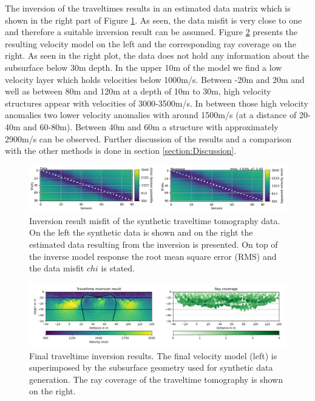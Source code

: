 The inversion of the traveltimes results in an estimated data matrix which is shown in the right part of Figure \ref{figure:TT_inversion_misfits}. As seen, the data misfit is very close to one and therefore a suitable inversion result can be assumed. Figure \ref{figure:TT_inversion_comp} presents the resulting velocity model on the left and the corresponding ray coverage on the right. As seen in the right plot, the data does not hold any information about the subsurface below 30m depth. In the upper 10m of the model we find a low velocity layer which holds velocities below 1000m/s. Between -20m and 20m and well as between 80m and 120m at a depth of 10m to 30m, high velocity structures appear with velocities of 3000-3500m/s. In between those high velocity anomalies two lower velocity anomalies with around 1500m/s (at a distance of 20-40m and 60-80m). Between 40m and 60m a structure with approximately 2900m/s can be observed. Further discussion of the results and a comparison with the other methods is done in section \ref{section:Discussion}.

\begin{figure}[]
  \centering
    \includegraphics[width=\textwidth]{Figures/TT_RF_labels.png}
    \caption[Traveltime inversion result misfit]{Inversion result misfit of the synthetic traveltime tomography data. On the left the synthetic data is shown and on the right the estimated data resulting from the inversion is presented. On top of the inverse model response the root mean square error (RMS) and the data misfit $chi$ is stated.}
    \label{figure:TT_inversion_misfits}
\end{figure}


\begin{figure}[]
  \centering
    \includegraphics[width=\textwidth]{Figures/TT_comp.png}
    \caption[Final velocity model after inversion]{Final traveltime inversion results. The final velocity model (left) is superimposed by the subsurface geometry used for synthetic data generation. The ray coverage of the traveltime tomography is shown on the right.}
    \label{figure:TT_inversion_comp}
\end{figure}

